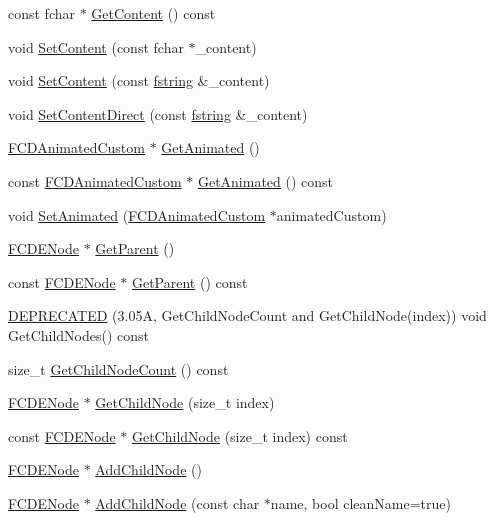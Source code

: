 \begin{DoxyCompactItemize}
\item 
const fchar $\ast$ \hyperlink{classFCDENode_a247bd3d75c6cb2687d7911dadd6d690b}{GetContent} () const 
\item 
void \hyperlink{classFCDENode_ac356dbe74452d564436e43dea7ac09f9}{SetContent} (const fchar $\ast$\_\-content)
\item 
void \hyperlink{classFCDENode_afa5aa472e42c4d60b5b3542a327271d5}{SetContent} (const \hyperlink{classfm_1_1stringT}{fstring} \&\_\-content)
\item 
void \hyperlink{classFCDENode_af047ec5be8f7729e3eaa197e56f3468f}{SetContentDirect} (const \hyperlink{classfm_1_1stringT}{fstring} \&\_\-content)
\item 
\hyperlink{classFCDAnimatedCustom}{FCDAnimatedCustom} $\ast$ \hyperlink{classFCDENode_aae36239184d7b2ffd48a521410597388}{GetAnimated} ()
\item 
const \hyperlink{classFCDAnimatedCustom}{FCDAnimatedCustom} $\ast$ \hyperlink{classFCDENode_ab58f086b7b09062047cb58b7a8e25742}{GetAnimated} () const 
\item 
void \hyperlink{classFCDENode_a98c5d2c96b15964037d6768f8194a32e}{SetAnimated} (\hyperlink{classFCDAnimatedCustom}{FCDAnimatedCustom} $\ast$animatedCustom)
\item 
\hyperlink{classFCDENode}{FCDENode} $\ast$ \hyperlink{classFCDENode_a072547f941f76cae03fbcb01b345a9f9}{GetParent} ()
\item 
const \hyperlink{classFCDENode}{FCDENode} $\ast$ \hyperlink{classFCDENode_a4fb6c8bde7310dcfd4718f140aa5d07c}{GetParent} () const 
\item 
\hyperlink{classFCDENode_a0dc118a86acd86d3be1e723e17d90272}{DEPRECATED} (3.05A, GetChildNodeCount and GetChildNode(index)) void GetChildNodes() const 
\item 
size\_\-t \hyperlink{classFCDENode_a75bb1798b9c6f99db77ef6d6559cf4f1}{GetChildNodeCount} () const 
\item 
\hyperlink{classFCDENode}{FCDENode} $\ast$ \hyperlink{classFCDENode_a5b6f7e6a52e743bd8280c2a96813e1c2}{GetChildNode} (size\_\-t index)
\item 
const \hyperlink{classFCDENode}{FCDENode} $\ast$ \hyperlink{classFCDENode_a1b96ab4f748661f9d22229c41f335607}{GetChildNode} (size\_\-t index) const 
\item 
\hyperlink{classFCDENode}{FCDENode} $\ast$ \hyperlink{classFCDENode_ac70023bb70d6a368233370e1cf4b4099}{AddChildNode} ()
\item 
\hyperlink{classFCDENode}{FCDENode} $\ast$ \hyperlink{classFCDENode_a6f9205591a7fa4027e9946757916ae4e}{AddChildNode} (const char $\ast$name, bool cleanName=true)

\end{DoxyCompactItemize}
